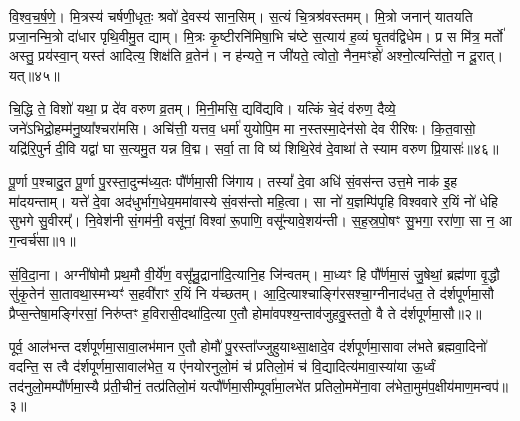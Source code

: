 वि॒श्व॒च॒र्\mbox{}ष॒णे॒। मि॒त्रस्य॑ चर्\mbox{}षणी॒धृतः॒ श्रवो॑ दे॒वस्य॑ सान॒सिम्। स॒त्यं चि॒त्रश्र॑वस्तमम्। मि॒त्रो जनान्॑ यातयति प्रजा॒नन्मि॒त्रो दा॑धार पृथि॒वीमु॒त द्याम्। मि॒त्रः कृ॒ष्टीरनि॑मिषा॒भि च॑ष्टे स॒त्याय॑ ह॒व्यं घृ॒तव॑द्विधेम। प्र स मि॑त्र॒ मर्तो॑ अस्तु॒ प्रय॑स्वा॒न् यस्त॑ आदित्य॒ शिक्ष॑ति व्र॒तेन॑। न ह॑न्यते॒ न जी॑यते॒ त्वोतो॒ नैन॒मꣳहो॑ अश्नो॒त्यन्ति॑तो॒ न दू॒रात्। यत्॥४५॥

चि॒द्धि ते॒ विशो॑ यथा॒ प्र दे॑व वरुण व्र॒तम्। मि॒नी॒मसि॒ द्यवि॑द्यवि। यत्किं चे॒दं व॑रुण॒ दैव्ये॒ जने॑\-ऽभिद्रो॒ह\-म्म॑नु॒ष्या᳚श्चरा॑मसि। अचि॑त्ती॒ यत्तव॒ धर्मा॑ युयोपि॒म मा न॒स्तस्मा॒देन॑सो देव रीरिषः। कि॒त॒वासो॒ यद्रि॑रि॒पुर्न दी॒वि यद्वा॑ घा स॒त्यमु॒त यन्न वि॒द्म। सर्वा॒ ता वि ष्य॑ शिथि॒रेव॑ दे॒वाथा॑ ते स्याम वरुण प्रि॒यासः॑॥४६॥

{\anuvakamend[{सोमो॒ गोषु॒ मा र॒यिं मन्त्रो॒ यच्छि॑थि॒रा स॒प्त च॑॥11॥}]}


{}

\setcounter{anuvakam}{0}
पू॒र्णा प॒श्चादु॒त पू॒र्णा पु॒रस्ता॒दुन्म॑ध्य॒तः पौ᳚र्णमा॒सी जि॑गाय। तस्यां᳚ दे॒वा अधि॑ सं॒वस॑न्त उत्त॒मे नाक॑ इ॒ह मा॑दयन्ताम्। यत्ते॑ दे॒वा अद॑धुर्भाग॒धेय॒ममा॑वास्ये सं॒वस॑न्तो महि॒त्वा। सा नो॑ य॒ज्ञम्पि॑पृहि विश्ववारे र॒यिं नो॑ धेहि सुभगे सु॒वीरम्᳚। नि॒वेश॑नी सं॒गम॑नी॒ वसू॑नां॒ विश्वा॑ रू॒पाणि॒ वसू᳚न्यावे॒शय॑न्ती। स॒ह॒स्र॒पो॒षꣳ सु॒भगा॒ ररा॑णा॒ सा न॒ आ ग॒न्वर्च॑सा॥१॥

सं॒वि॒दा॒ना। अग्नी॑षोमौ प्रथ॒मौ वी॒र्ये॑ण॒ वसू᳚न्रु॒द्राना॑दि॒त्यानि॒ह जि॑न्वतम्। मा॒ध्यꣳ हि पौ᳚र्णमा॒सं जु॒षेथां॒ ब्रह्म॑णा वृ॒द्धौ सु॑कृ॒तेन॑ सा॒तावथा॒स्मभ्यꣳ॑ स॒हवी॑राꣳ र॒यिं नि य॑च्छतम्। आ॒दि॒त्याश्चाङ्गि॑रसश्चा॒ग्नीनाद॑धत॒ ते द॑र्\mbox{}शपूर्णमा॒सौ प्रैप्स॒न्तेषा॒मङ्गि॑रसां॒ निरु॑प्तꣳ ह॒विरासी॒दथा॑दि॒त्या ए॒तौ होमा॑वपश्य॒न्ताव॑जुहवु॒स्ततो॒ वै ते द॑र्\mbox{}शपूर्णमा॒सौ॥२॥

पूर्व॒ आल॑भन्त दर्\mbox{}शपूर्णमा॒सावा॒लभ॑मान ए॒तौ होमौ॑ पु॒रस्ता᳚ज्जुहुयाथ्सा॒क्षादे॒व द॑र्\mbox{}शपूर्णमा॒सावा ल॑भते ब्रह्मवा॒दिनो॑ वदन्ति॒ स त्वै द॑र्\mbox{}शपूर्णमा॒सावाल॑भेत॒ य ए॑नयोरनुलो॒मं च॑ प्रतिलो॒मं च॑ वि॒द्यादित्य॑मावा॒स्या॑या ऊ॒र्ध्वं तद॑नुलो॒म\-म्पौ᳚र्णमा॒स्यै प्र॑ती॒चीनं॒ तत्प्र॑तिलो॒मं यत्पौ᳚र्णमा॒सीम्पूर्वा॑मा॒लभे॑त प्रतिलो॒ममे॑ना॒वा ल॑भेता॒मुम॑प॒क्षीय॑माण॒मन्वप॑॥३॥

